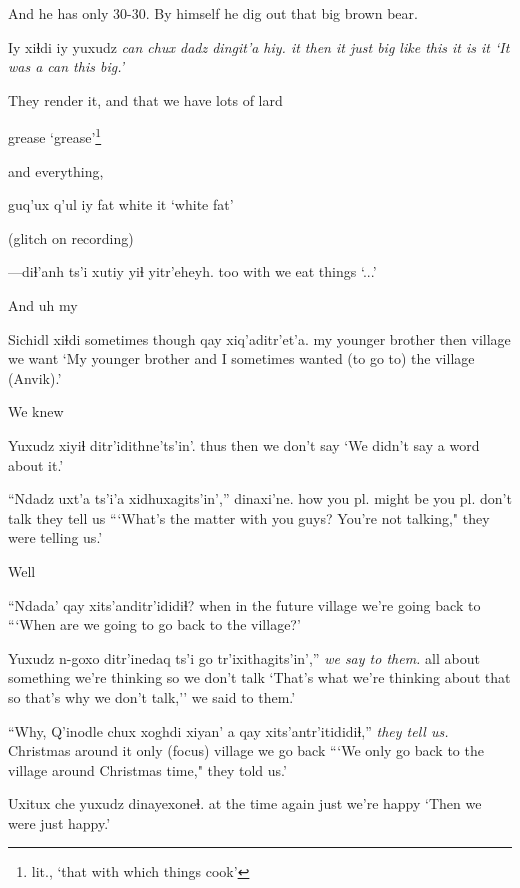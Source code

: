 \documentclass[12pt]{article}
\begin{document}
And he has only 30-30. By himself he dig out that big brown bear. 

\gll Iy xiɬdi iy yuxudz \em can \em chux dadz      dingit'a hiy.
it then  it just    {}    big  {like this} {it is}    it
\glt `It was a can this big.'
\glend

They render it, and that we have lots of lard

{{grease}}
\glt `grease'\footnote{lit., `that with which things cook'}
\glend

and everything,

\gll guq'ux q'ul   iy
fat white it
\glt `white fat'
\glend

(glitch on recording) 

\gll ---diɬ'anh ts'i xutiy yiɬ  yitr'eheyh.
{}       {}      too   with {we eat things}
\glt `...'
\glend

And uh my

\gll Sichidl            xiɬdi {sometimes though} qay     xiq'aditr'et'a.
{my younger brother} then  {} village {we want}
\glt `My younger brother and I sometimes wanted (to go to) the village (Anvik).'
\glend

We knew

\gll Yuxudz xiyiɬ {ditr'idithne'ts'in'.}
thus   then  {we don't say}
\glt `We didn't say a word about it.'
\glend

\gll ``Ndadz uxt'a           ts'i'a {xidhuxagits'in'},'' dinaxi'ne.
how   {you pl. might be} {}  {you pl. don't talk} {they tell us}
\glt ```What's the matter with you guys? You're not talking," they were telling us.'
\glend

Well

\gll ``Ndada' qay     xits'anditr'ididiɬ?
{when in the future} village {we're going back to}
\glt ```When are we going to go back to the village?'
\glend

\gll Yuxudz n-goxo            ditr'inedaq   {ts'i go}   {tr'ixithagits'in',}'' {\em we say to them.}
all    {about something} {we're thinking} so {we don't talk}
\glt `That's what we're thinking about that so that's why we don't talk,'' we said to them.'
\glend

\gll ``Why, {Q'inodle chux}  xoghdi xiyan' a qay     xits'antr'itididiɬ,'' {\em they tell us.}
{}   Christmas        {around it} only   {(focus)} village {we go back}
\glt ```We only go back to the village around Christmas time," they told us.'
\glend

\gll Uxitux che  yuxudz dinayexoneɬ.
{at the time} again just {we're happy}
\glt `Then we were just happy.'
\glend
\end{document}

